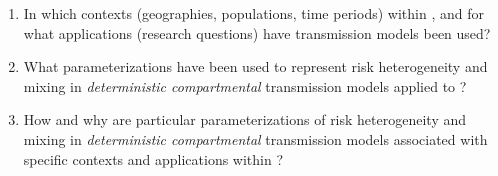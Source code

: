 \begin{enumerate}
  \item\label{q:context}
  In which contexts (geographies, populations, time periods)
  within \ssa, and
  for what applications (research questions)
  have \hiv transmission models been used?
  \item\label{q:hetero}
  What parameterizations have been used
  to represent risk heterogeneity and mixing
  in \emph{deterministic compartmental} \hiv transmission models
  applied to \ssa?
  \item\label{q:trends}
  How and why are particular parameterizations of risk heterogeneity and mixing
  in \emph{deterministic compartmental} \hiv transmission models
  associated with specific contexts and applications within \ssa?
\end{enumerate}
